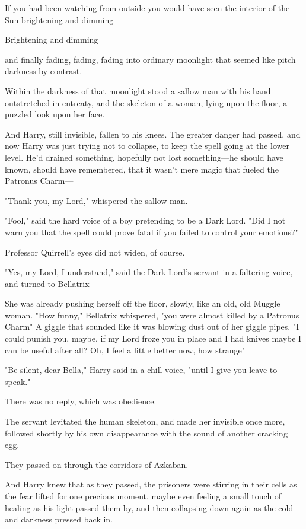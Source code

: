 If you had been watching from outside you would have seen the interior of the
Sun brightening and dimming{\el}

Brightening and dimming{\el}

{\el} and finally fading, fading, fading into ordinary moonlight that seemed
like pitch darkness by contrast.

Within the darkness of that moonlight stood a sallow man with his hand
outstretched in entreaty, and the skeleton of a woman, lying upon the floor, a
puzzled look upon her face.

And Harry, still invisible, fallen to his knees. The greater danger had passed,
and now Harry was just trying not to collapse, to keep the spell going at the
lower level. He'd drained something, hopefully not lost something—he
should have known, should have remembered, that it wasn't mere magic that
fueled the Patronus Charm—

"Thank you, my Lord," whispered the sallow man.

"Fool," said the hard voice of a boy pretending to be a Dark Lord. "Did I not
warn you that the spell could prove fatal if you failed to control your
emotions?"

Professor Quirrell's eyes did not widen, of course.

"Yes, my Lord, I understand," said the Dark Lord's servant in a faltering
voice, and turned to Bellatrix—

She was already pushing herself off the floor, slowly, like an old, old Muggle
woman. "How funny," Bellatrix whispered, "you were almost killed by a Patronus
Charm{\el}" A giggle that sounded like it was blowing dust out of her giggle
pipes. "I could punish you, maybe, if my Lord froze you in place and I had
knives{\el} maybe I can be useful after all? Oh, I feel a little better now,
how strange{\el}"

"Be silent, dear Bella," Harry said in a chill voice, "until I give you leave
to speak."

There was no reply, which was obedience.

The servant levitated the human skeleton, and made her invisible once more,
followed shortly by his own disappearance with the sound of another cracking
egg.

They passed on through the corridors of Azkaban.

And Harry knew that as they passed, the prisoners were stirring in their cells
as the fear lifted for one precious moment, maybe even feeling a small touch of
healing as his light passed them by, and then collapsing down again as the cold
and darkness pressed back in.

